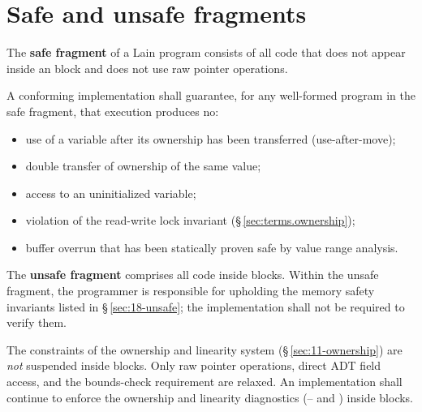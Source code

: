 \section{Safe and unsafe fragments}
\label{sec:conformance.safe-unsafe}

\pnum
The \textbf{safe fragment} of a Lain program consists of all code that does
not appear inside an  block and does not use raw pointer
operations.

\pnum
A conforming implementation shall guarantee, for any well-formed program
in the safe fragment, that execution produces no:

\begin{itemize}
  \item use of a variable after its ownership has been transferred (use-after-move);
  \item double transfer of ownership of the same value;
  \item access to an uninitialized variable;
  \item violation of the read-write lock invariant
        (\S\,\ref{sec:terms.ownership});
  \item buffer overrun that has been statically proven safe by value range
        analysis.
\end{itemize}

\pnum
The \textbf{unsafe fragment} comprises all code inside 
blocks.  Within the unsafe fragment, the programmer is responsible for
upholding the memory safety invariants listed in
\S\,\ref{sec:18-unsafe}; the implementation shall not be required to
verify them.

\begin{constraint}
  The constraints of the ownership and linearity system
  (\S\,\ref{sec:11-ownership}) are \emph{not} suspended inside
   blocks.  Only raw pointer operations, direct ADT field
  access, and the bounds-check requirement are relaxed.  An implementation
  shall continue to enforce the ownership and linearity diagnostics
  (-- and ) inside
   blocks.
\end{constraint}
